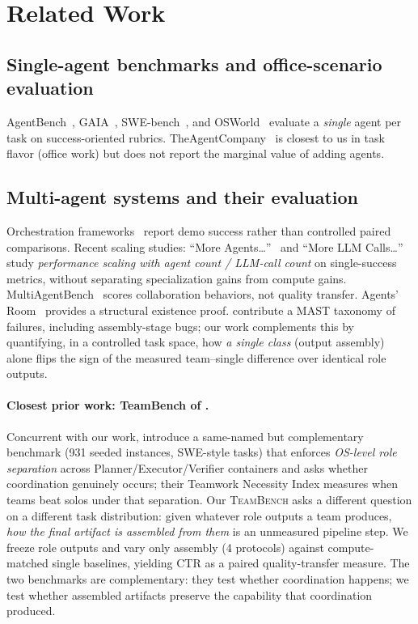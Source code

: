 \documentclass[sigconf,anonymous]{aamas}
\newcommand{\teambench}{\textsc{TeamBench}}
\begin{document}
\section{Related Work}
\label{sec:related}

\subsection{Single-agent benchmarks and office-scenario evaluation}
AgentBench~\citep{liu2023agentbench}, GAIA~\citep{mialon2023gaia}, SWE-bench~\citep{jimenez2024swebench}, and OSWorld~\citep{xie2024osworld} evaluate a \emph{single} agent per task on success-oriented rubrics. TheAgentCompany~\citep{xu2024theagentcompany} is closest to us in task flavor (office work) but does not report the marginal value of adding agents.

\subsection{Multi-agent systems and their evaluation}
Orchestration frameworks~\citep{wu2023autogen,hong2024metagpt,crewai2024,langgraph2024,qian2024chatdev} report demo success rather than controlled paired comparisons. Recent scaling studies: ``More Agents\ldots''~\citep{li2024moreagents} and ``More LLM Calls\ldots''~\citep{chen2024morellmcalls} study \emph{performance scaling with agent count / LLM-call count} on single-success metrics, without separating specialization gains from compute gains. MultiAgentBench~\citep{zhu2025multiagentbench} scores collaboration behaviors, not quality transfer. Agents' Room~\citep{huot2025agentsroom} provides a structural existence proof. \citet{cemri2025masfail} contribute a MAST taxonomy of failures, including assembly-stage bugs; our work complements this by quantifying, in a controlled task space, how \emph{a single class} (output assembly) alone flips the sign of the measured team--single difference over identical role outputs.

\paragraph{Closest prior work: TeamBench of \citet{kim2026teambench}.}
Concurrent with our work, \citet{kim2026teambench} introduce a same-named but complementary benchmark (931 seeded instances, SWE-style tasks) that enforces \emph{OS-level role separation} across Planner/Executor/Verifier containers and asks whether coordination genuinely occurs; their Teamwork Necessity Index measures when teams beat solos under that separation. Our \teambench{} asks a different question on a different task distribution: given whatever role outputs a team produces, \emph{how the final artifact is assembled from them} is an unmeasured pipeline step. We freeze role outputs and vary only assembly (4 protocols) against compute-matched single baselines, yielding CTR as a paired quality-transfer measure. The two benchmarks are complementary: they test whether coordination happens; we test whether assembled artifacts preserve the capability that coordination produced.
\end{document}
